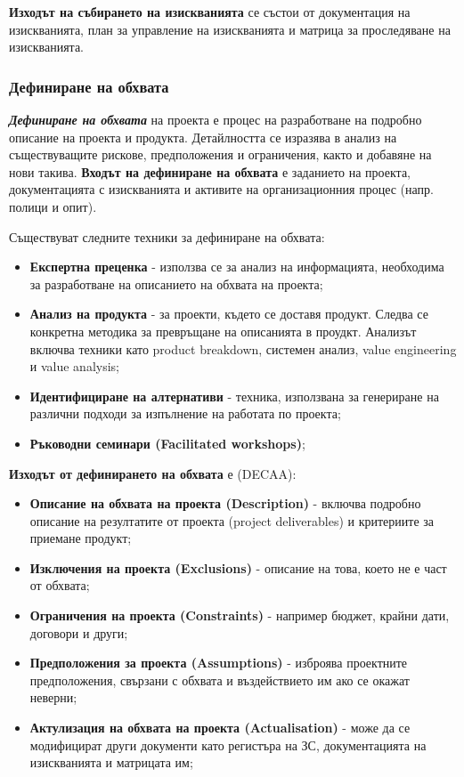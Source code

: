 \documentclass[fleqn,12pt]{article}
\begin{document}
\textbf{Изходът на събирането на изискванията} се състои от документация на изискванията, план за управление на изискванията и матрица за проследяване на изискванията.

\subsubsection{Дефиниране на обхвата}

\textbf{\textit{Дефиниране на обхвата}} на проекта е процес на разработване на подробно описание на проекта и продукта.
Детайлността се изразява в анализ на съществуващите рискове, предположения и ограничения, както и добавяне на нови такива.
\bigbreak
\textbf{Входът на дефиниране на обхвата} е заданието на проекта, документацията с изискванията и активите на организационния процес (напр. полици и опит).
\bigbreak

Съществуват следните техники за дефиниране на обхвата:
\begin{itemize}
    \item \textbf{Експертна преценка} - използва се за анализ на информацията, необходима за разработване на описанието на обхвата на проекта;
    \item \textbf{Анализ на продукта} - за проекти, където се доставя продукт.
    Следва се конкретна методика за превръщане на описанията в проудкт.
    Анализът включва техники като product breakdown, системен анализ, value engineering  и value analysis;
    \item \textbf{Идентифициране на алтернативи} - техника, използвана за генериране на различни подходи за изпълнение на работата по проекта;
    \item \textbf{Ръководни семинари (Facilitated workshops)};
\end{itemize}

\textbf{Изходът от дефинирането на обхвата} е (DECAA):
\begin{itemize}
    \item \textbf{Описание на обхвата на проекта (Description)} - включва подробно описание на резултатите от проекта (project deliverables) и критериите за приемане продукт;
    \item \textbf{Изключения на проекта (Exclusions)} - описание на това, което не е част от обхвата;
    \item \textbf{Ограничения на проекта (Constraints)} - например бюджет, крайни дати, договори и други;
    \item \textbf{Предположения за проекта (Assumptions)} - изброява проектните предположения, свързани с обхвата и въздействието им ако се окажат неверни;
    \item \textbf{Актулизация на обхвата на проекта (Actualisation)} - може да се модифицират други документи като регистъра на ЗС, документацията на изискванията и матрицата им;
\end{itemize}
\end{document}
